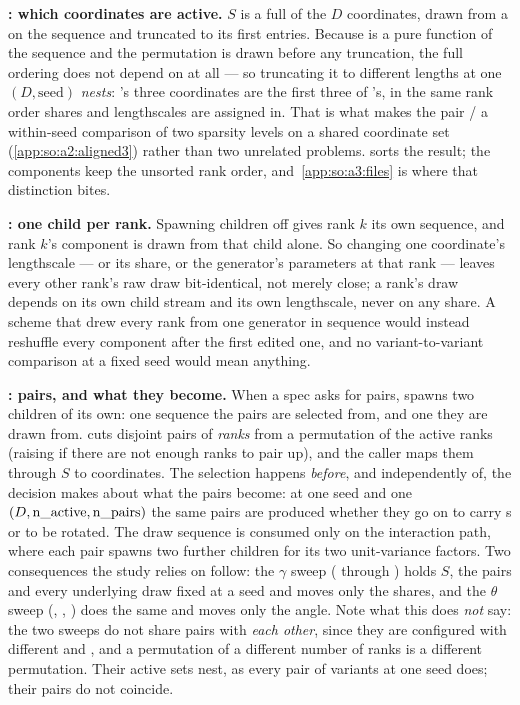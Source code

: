 \textbf{: which coordinates are active.} $S$ is a full
 of the $D$ coordinates, drawn from a
 on the  sequence and truncated to its
first  entries. Because
 is a pure function of the sequence and the permutation is
drawn before any truncation, the full ordering does not depend on
 at all --- so truncating it to different lengths at one
$(D,\text{seed})$ \emph{nests}: 's three coordinates are the
first three of 's, in the same rank order shares and
lengthscales are assigned in. That is what makes the pair
/ a within-seed comparison of two sparsity
levels on a shared coordinate set (\ref{app:so:a2:aligned3}) rather than two
unrelated problems.  sorts the result; the components keep the
unsorted rank order, and~\ref{app:so:a3:files} is where that distinction bites.

\textbf{: one child per rank.} Spawning 
children off 
gives rank $k$ its own sequence, and rank $k$'s component is drawn from that
child alone. So changing one coordinate's lengthscale --- or its share, or the
generator's parameters at that rank --- leaves every other rank's raw draw
bit-identical, not merely close; a rank's draw depends on its own child stream
and its own lengthscale, never on any share. A scheme that drew every rank from
one generator in sequence would instead reshuffle every component after the first
edited one, and no variant-to-variant comparison at a fixed seed would mean
anything.

\textbf{: pairs, and what they become.} When a spec asks for
pairs,  spawns two children of its own: one sequence the pairs
are selected from, and one they are drawn from.  cuts
disjoint pairs of \emph{ranks} from a permutation of the active ranks (raising
 if there are not enough ranks to pair up), and the caller
maps them through $S$ to coordinates. The selection happens \emph{before}, and
independently of, the decision  makes about what the pairs
become: at one seed and one $(D,\text{\SOcode{n\_active}},
\text{\SOcode{n\_pairs}})$ the same pairs are produced whether they go on to
carry s or to be rotated. The draw sequence is consumed
only on the interaction path, where each pair spawns two further children for
its two unit-variance factors. Two consequences the study relies on follow: the
$\gamma$ sweep ( through
) holds $S$, the pairs and every underlying draw
fixed at a seed and moves only the shares, and the $\theta$ sweep
(, , ) does the
same and moves only the angle. Note what this does \emph{not} say: the two
sweeps do not share pairs with \emph{each other}, since they are configured
with different  and , and a permutation of a
different number of ranks is a different permutation. Their active sets nest,
as every pair of variants at one seed does; their pairs do not coincide.

